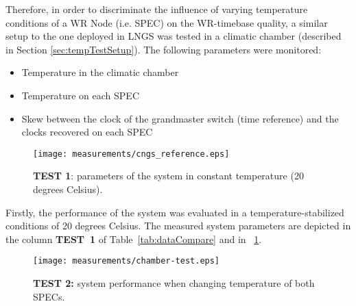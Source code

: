 Therefore, in order to discriminate the influence of varying temperature conditions of a 
WR Node (i.e. SPEC) on the WR-timebase quality, a similar setup to the one 
deployed in LNGS was tested in a climatic chamber (described in Section \ref{sec:tempTestSetup}). 
The following parameters were monitored:
\begin{itemize}
  \item Temperature in the climatic chamber
  \item Temperature on each SPEC
  \item Skew between the clock of the grandmaster switch (time reference) and the clocks recovered 
        on each SPEC
\end{itemize}

\begin{figure}[!t]
\centering
\texttt{[image: measurements/cngs\_reference.eps]}
\caption{\textbf{TEST 1}: parameters of the system in constant temperature (20 degrees Celsius).}
\label{fig:chamber-ref}
\end{figure}
% 

Firstly, the performance of the system was evaluated in a temperature-stabilized conditions of 
20 degrees Celsius. The measured 
system parameters are depicted in the column \textbf{TEST~1} of Table~\ref{tab:dataCompare} and in 
\figurename~\ref{fig:chamber-ref}.


\begin{figure}[!t]
\centering
\texttt{[image: measurements/chamber-test.eps]}
\caption{\textbf{TEST 2:} system performance when changing temperature of both SPECs.}
\label{fig:chamber-test}
\end{figure}


